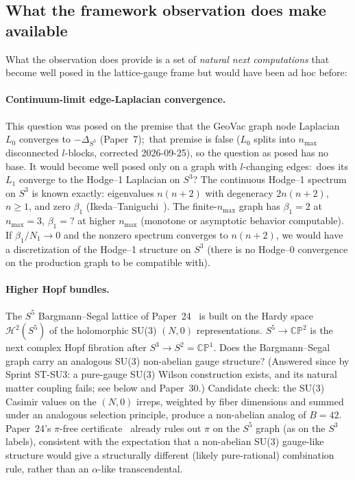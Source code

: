\documentclass[aps,pra,twocolumn,superscriptaddress,longbibliography]{revtex4-2}
\begin{document}
\subsection{What the framework observation does make available}

What the observation does provide is a set of \emph{natural next
computations} that become well posed in the lattice-gauge frame but
would have been ad hoc before:

\paragraph*{Continuum-limit edge-Laplacian convergence.} This question
was posed on the premise that the GeoVac graph node Laplacian $L_0$
converges to $-\Delta_{S^3}$ (Paper~7);\ that premise is false ($L_0$
splits into $n_{\max}$ disconnected $l$-blocks, corrected 2026-09-25),
so the question as posed has no base.  It would become well posed only
on a graph with $l$-changing edges:\ does its $L_1$ converge to the
Hodge--1 Laplacian on $S^3$?  The continuous Hodge--1 spectrum on
$S^3$ is known exactly: eigenvalues $n(n+2)$ with degeneracy
$2n(n+2)$, $n \geq 1$, and zero $\beta_1$
(Ikeda--Taniguchi~\cite{IkedaTaniguchi1978}).  The finite-$n_{\max}$
graph has $\beta_1 = 2$ at $n_{\max} = 3$, $\beta_1 = ?$ at higher
$n_{\max}$ (monotone or asymptotic behavior computable).  If
$\beta_1 / N_1 \to 0$ and the nonzero spectrum converges to
$n(n+2)$, we would have a discretization of the Hodge--1 structure on
$S^3$ (there is no Hodge--0 convergence on the production graph to be
compatible with).

\paragraph*{Higher Hopf bundles.} The $S^5$ Bargmann--Segal lattice
of Paper~24~\cite{Paper24} is built on the Hardy space
$\mathcal{H}^2(S^5)$ of the holomorphic SU(3) $(N, 0)$
representations.  $S^5 \to \mathbb{CP}^2$ is the next complex Hopf
fibration after $S^3 \to S^2 = \mathbb{CP}^1$.  Does the
Bargmann--Segal graph carry an analogous SU(3) non-abelian gauge
structure?  (Answered since by Sprint ST-SU3: a pure-gauge SU(3)
Wilson construction exists, and its natural matter coupling fails;
see below and Paper~30.)  Candidate check: the SU(3) Casimir values on the
$(N, 0)$ irreps, weighted by fiber dimensions and summed under an
analogous selection principle, produce a non-abelian analog of
$B = 42$.  Paper~24's $\pi$-free certificate~\cite{Paper24} already
rules out $\pi$ on the $S^5$ graph (as on the $S^3$ labels), consistent
with the expectation that a non-abelian SU(3) gauge-like structure
would give a structurally different (likely pure-rational)
combination rule, rather than an $\alpha$-like transcendental.
\end{document}

